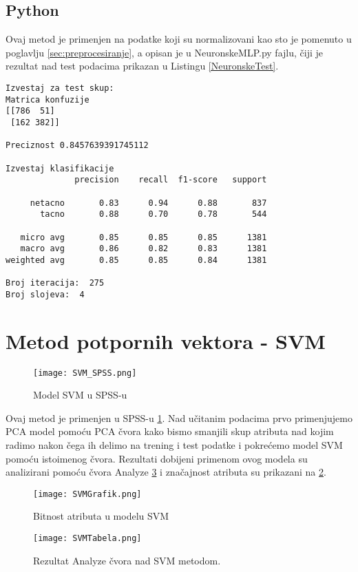 \documentclass[a4paper]{article}
\begin{document}
\subsection{Python}

Ovaj metod je primenjen na podatke koji su normalizovani kao sto je pomenuto u poglavlju \ref{sec:preprocesiranje}, a opisan je u NeuronskeMLP.py fajlu, čiji je rezultat nad test podacima prikazan u Listingu \ref{NeuronskeTest}. 
\\

\begin{lstlisting}[caption={Rezultat nad test podacima},frame=single, label=NeuronskeTest]
Izvestaj za test skup:
Matrica konfuzije
[[786  51]
 [162 382]]

Preciznost 0.8457639391745112

Izvestaj klasifikacije
              precision    recall  f1-score   support

     netacno       0.83      0.94      0.88       837
       tacno       0.88      0.70      0.78       544

   micro avg       0.85      0.85      0.85      1381
   macro avg       0.86      0.82      0.83      1381
weighted avg       0.85      0.85      0.84      1381

Broj iteracija:  275
Broj slojeva:  4
\end{lstlisting} 


\section{Metod potpornih vektora - SVM}
\label{sec:SVM}

\begin{figure}[ht!]
    \centering
    \texttt{[image: SVM\_SPSS.png]}
    \caption{Model SVM u SPSS-u}
    \label{fig:SVM_SPSS}
\end{figure}

Ovaj metod je primenjen u SPSS-u \ref{fig:SVM_SPSS}. Nad učitanim podacima prvo primenjujemo PCA model pomoću PCA čvora kako bismo smanjili skup atributa nad kojim radimo nakon čega ih delimo na trening i test podatke i pokrećemo model SVM pomoću istoimenog čvora. Rezultati dobijeni primenom ovog modela su analizirani pomoću čvora Analyze \ref{fig:SVMTabela} i značajnost atributa su prikazani na \ref{fig:SVMGrafik}. 

\begin{figure}[ht!]
    \centering
    \texttt{[image: SVMGrafik.png]}
    \caption{Bitnost atributa u modelu SVM}
    \label{fig:SVMGrafik}
\end{figure}
\begin{figure}[ht!]
    \centering
    \texttt{[image: SVMTabela.png]}
    \caption{Rezultat Analyze čvora nad SVM metodom. }
    \label{fig:SVMTabela}
\end{figure}
\end{document}
